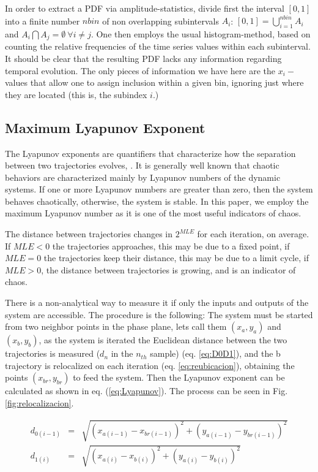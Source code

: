 \documentclass[conference]{IEEEtran}
\begin{document}
In order to  extract a PDF via amplitude-statistics, divide first
the interval $[0,1]$ into a finite number $nbin$ of non
overlapping subintervals $A_i$: $[0,1]=\bigcup_{i=1}^{nbin} A_i$
and $A_i\bigcap A_j=\emptyset~\forall i\neq j$. One then employs
the usual histogram-method, based on counting the relative
frequencies of the time series values within each subinterval. It
should be clear that the resulting  PDF lacks any information
regarding temporal evolution. The only pieces of information we
have here are the $x_i-$values that allow one to assign inclusion
within a given bin, ignoring just where they are located (this is,
the subindex $i$.)

\subsection{Maximum Lyapunov Exponent}

The Lyapunov exponents are quantifiers that characterize how the
separation between two trajectories evolves, \cite{Sprott2003}. It
is generally well known that chaotic behaviors are characterized
mainly by Lyapunov numbers of the dynamic systems. If one or more
Lyapunov numbers are greater than zero, then the system behaves
chaotically, otherwise, the system is stable. In this paper, we
employ the maximum Lyapunov number as it is one of the most useful
indicators of chaos.

The distance between trajectories changes in $2^{MLE}$ for each
iteration, on average. If $MLE<0$ the trajectories approaches,
this may be due to a fixed point, if $MLE=0$ the trajectories keep
their distance, this may be due to a limit cycle, if $MLE>0$, the
distance between trajectories is growing, and is an indicator of
chaos. \cite{Sprott2003}

There is a non-analytical way to measure it if only the inputs and
outputs of the system are accessible. The procedure is the
following: The system must be started from two neighbor points in
the phase plane, lets call them $(x_a,y_a)$ and $(x_b,y_b)$, as
the system is iterated the Euclidean distance between the two
trajectories is measured ($d_n$ in the $n_{th}$ sample) (eq.
\ref{eq:D0D1}), and the b trajectory is relocalized on each
iteration  (eq. \ref{eq:reubicacion}), obtaining the points
$(x_{br},y_{br})$ to feed the system. Then the Lyapunov exponent
can be calculated as shown in eq. (\ref{eq:Lyapunov}). The process
can be seen in Fig. \ref{fig:relocalizacion}.


\begin{eqnarray}\label{eq:D0D1}
    d_{0(i-1)}&=& \sqrt{(x_{a(i-1)}-x_{br(i-1)})^2+(y_{a(i-1)}-y_{br(i-1)})^2}\nonumber\\
    d_{1(i)}&=& \sqrt{(x_{a(i)}-x_{b(i)})^2+(y_{a(i)}-y_{b(i)})^2}\\
\nonumber
\end{eqnarray}
\end{document}
